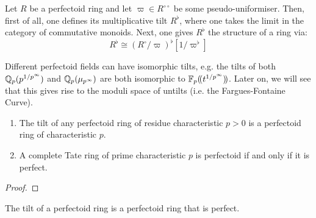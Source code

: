                 \begin{definition}[Tilts] \label{def: perfectoid_tilts}
                    Let $R$ be a perfectoid ring and let $\varpi \in R^{\circ \circ}$ be some pseudo-uniformiser. Then, first of all, one defines its multiplicative tilt $R^{\flat}$, where one takes the limit in the category of commutative monoids. Next, one gives $R^{\flat}$ the structure of a ring via:
                        $$R^{\flat} \cong (R^{\circ}/\varpi)^{\flat}[1/\varpi^{\flat}]$$
                \end{definition}
                \begin{example}
                    Different perfectoid fields can have isomorphic tilts, e.g. the tilts of both $\mathbb{Q}_p(p^{1/p^{\infty}})$ and $\mathbb{Q}_p(\mu_{p^{\infty}})$ are both isomorphic to $\mathbb{F}_p(\!(t^{1/p^{\infty}})\!)$. Later on, we will see that this gives rise to the moduli space of untilts (i.e. the Fargues-Fontaine Curve).
                \end{example}
                
                \begin{lemma} \label{lemma: perfectoid_tilts_are_perfect}
                    \noindent
                    \begin{enumerate}
                        \item The tilt of any perfectoid ring of residue characteristic $p > 0$ is a perfectoid ring of characteristic $p$. 
                        \item A complete Tate ring of prime characteristic $p$ is perfectoid if and only if it is perfect. 
                    \end{enumerate}
                \end{lemma}
                    \begin{proof}
                        
                    \end{proof}
                \begin{corollary} \label{coro: perfectoid_tilts_are_perfect}
                    The tilt of a perfectoid ring is a perfectoid ring that is perfect.
                \end{corollary}
                
